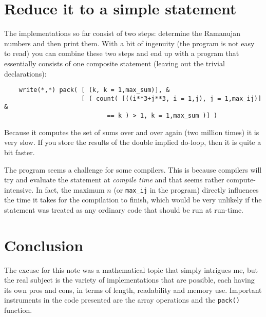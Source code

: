 \documentclass[onecolumn]{article}
\begin{document}
\section*{Reduce it to a simple statement}
The implementations so far consist of two steps: determine the Ramanujan numbers and then print them. With a bit of ingenuity (the program
is not easy to read) you can combine these two steps and end up with a program that essentially consists of one composite statement (leaving
out the trivial declarations):

\begin{verbatim}
    write(*,*) pack( [ (k, k = 1,max_sum)], &
                     [ ( count( [((i**3+j**3, i = 1,j), j = 1,max_ij)] &
                            == k ) > 1, k = 1,max_sum )] )
\end{verbatim}

Because it computes the set of sums over and over again (two million times) it is very slow. If you store the results of the
double implied do-loop, then it is quite a bit faster.

The program seems a challenge for some compilers. This is because compilers will try and evaluate the statement at \emph{compile time}
and that seems rather compute-intensive. In fact, the maximum $n$ (or \verb+max_ij+ in the program) directly influences the time it takes for
the compilation to finish, which would be very unlikely if the statement was treated as any ordinary code that should be run at run-time.

\section*{Conclusion}
The excuse for this note was a mathematical topic that simply intrigues me, but the real subject is the variety of implementations that
are possible, each having its own pros and cons, in terms of length, readability and memory use. Important instruments in the code presented
are the array operations and the \verb+pack()+ function.
\end{document}
